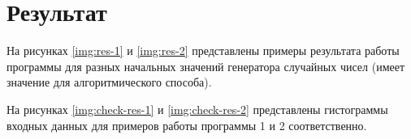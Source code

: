 \chapter{Результат}

На рисунках \ref{img:res-1} и \ref{img:res-2} представлены примеры результата работы программы 
для разных начальных значений генератора случайных чисел (имеет значение для алгоритмического способа).

На рисунках \ref{img:check-res-1} и \ref{img:check-res-2} представлены гистограммы входных данных для примеров работы программы 1 и 2 соответственно.


{}




